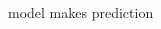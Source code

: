 \documentclass[presentation]{subfiles}
\begin{document}
\begin{frame}[t]
\begin{columns}
\begin{column}{0.16\textwidth}
\begin{center}
{model makes prediction}
\end{center}
\end{column}

\begin{column}{0.16\textwidth}
\begin{center}
{}
\end{center}
\end{column}
\end{columns}
\end{frame}
\end{document}
